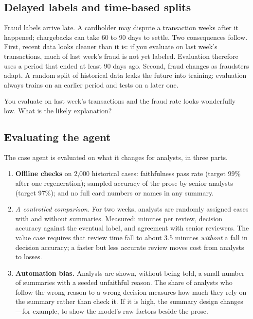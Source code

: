 \subsection{Delayed labels and time-based splits}

Fraud labels arrive late. A cardholder may dispute a transaction weeks after it happened; chargebacks can take 60 to 90 days to settle. Two consequences follow. First, recent data looks cleaner than it is: if you evaluate on last week's transactions, much of last week's fraud is not yet labeled. Evaluation therefore uses a period that ended at least 90 days ago. Second, fraud changes as fraudsters adapt. A random split of historical data leaks the future into training; evaluation always trains on an earlier period and tests on a later one.

\begin{quickcheck}
You evaluate on last week's transactions and the fraud rate looks wonderfully low. What is the likely explanation?
\end{quickcheck}

\subsection{Evaluating the agent}

The case agent is evaluated on what it changes for analysts, in three parts.
\begin{enumerate}[itemsep=2pt]
  \item \textbf{Offline checks} on 2{,}000 historical cases: faithfulness pass rate (target 99\% after one regeneration); sampled accuracy of the prose by senior analysts (target 97\%); and no full card numbers or names in any summary.
  \item \emph{A controlled comparison.} For two weeks, analysts are randomly assigned cases with and without summaries. Measured: minutes per review, decision accuracy against the eventual label, and agreement with senior reviewers. The value case requires that review time fall to about 3.5 minutes \emph{without} a fall in decision accuracy; a faster but less accurate review moves cost from analysts to losses.
  \item \textbf{Automation bias.} Analysts are shown, without being told, a small number of summaries with a seeded unfaithful reason. The share of analysts who follow the wrong reason to a wrong decision measures how much they rely on the summary rather than check it. If it is high, the summary design changes---for example, to show the model's raw factors beside the prose.
\end{enumerate}


